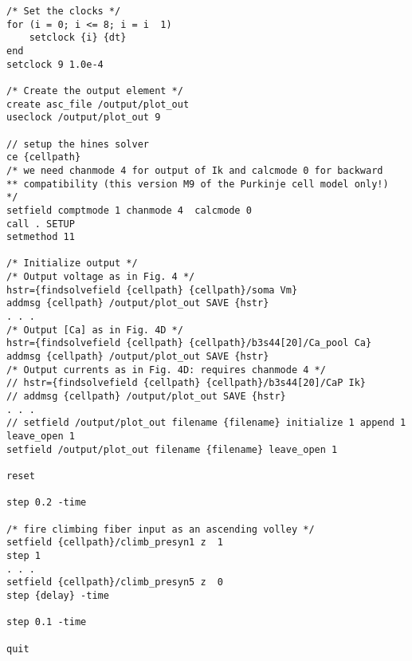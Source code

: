 \documentclass[10pt]{article}
\begin{document}
\begin{linenumbers}
\begin{verbatim}
/* Set the clocks */
for (i = 0; i <= 8; i = i  1)
    setclock {i} {dt}
end
setclock 9 1.0e-4

/* Create the output element */
create asc_file /output/plot_out
useclock /output/plot_out 9

// setup the hines solver
ce {cellpath}
/* we need chanmode 4 for output of Ik and calcmode 0 for backward 
** compatibility (this version M9 of the Purkinje cell model only!)
*/
setfield comptmode 1 chanmode 4  calcmode 0
call . SETUP
setmethod 11

/* Initialize output */
/* Output voltage as in Fig. 4 */
hstr={findsolvefield {cellpath} {cellpath}/soma Vm}
addmsg {cellpath} /output/plot_out SAVE {hstr}
. . .
/* Output [Ca] as in Fig. 4D */
hstr={findsolvefield {cellpath} {cellpath}/b3s44[20]/Ca_pool Ca}
addmsg {cellpath} /output/plot_out SAVE {hstr}
/* Output currents as in Fig. 4D: requires chanmode 4 */
// hstr={findsolvefield {cellpath} {cellpath}/b3s44[20]/CaP Ik}
// addmsg {cellpath} /output/plot_out SAVE {hstr}
. . .
// setfield /output/plot_out filename {filename} initialize 1 append 1 leave_open 1
setfield /output/plot_out filename {filename} leave_open 1

reset

step 0.2 -time

/* fire climbing fiber input as an ascending volley */
setfield {cellpath}/climb_presyn1 z  1
step 1
. . .
setfield {cellpath}/climb_presyn5 z  0
step {delay} -time

step 0.1 -time

quit

\end{verbatim}
\end{linenumbers}
\end{document}
